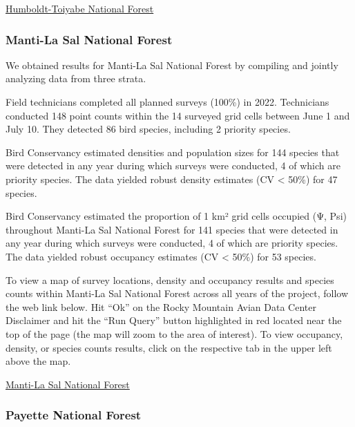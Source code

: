 \documentclass[
  letterpaper,
  DIV=11,
  numbers=noendperiod,
  oneside]{scrreprt}
\begin{document}
\href{http://www.rmbo.org/new_site/adc/QueryWindow.aspx\#N4IgzgrgDgpgTmALnAhoiBbEAuABCACUwCMB7AGwBNEBaAFVIEsBPFYmXAOTUdIDsU5XADFScGEhABfIA===}{Humboldt-Toiyabe
National Forest}

\hypertarget{manti-la-sal-national-forest}{%
\subsubsection{Manti-La Sal National
Forest}\label{manti-la-sal-national-forest}}

We obtained results for Manti-La Sal National Forest by compiling and
jointly analyzing data from three strata.

Field technicians completed all planned surveys (100\%) in 2022.
Technicians conducted 148 point counts within the 14 surveyed grid cells
between June 1 and July 10. They detected 86 bird species, including 2
priority species.

Bird Conservancy estimated densities and population sizes for 144
species that were detected in any year during which surveys were
conducted, 4 of which are priority species. The data yielded robust
density estimates (CV \textless{} 50\%) for 47 species.

Bird Conservancy estimated the proportion of 1 km² grid cells occupied
(Ψ, Psi) throughout Manti-La Sal National Forest for 141 species that
were detected in any year during which surveys were conducted, 4 of
which are priority species. The data yielded robust occupancy estimates
(CV \textless{} 50\%) for 53 species.

To view a map of survey locations, density and occupancy results and
species counts within Manti-La Sal National Forest across all years of
the project, follow the web link below. Hit ``Ok'' on the Rocky Mountain
Avian Data Center Disclaimer and hit the ``Run Query'' button
highlighted in red located near the top of the page (the map will zoom
to the area of interest). To view occupancy, density, or species counts
results, click on the respective tab in the upper left above the map.

\href{http://www.rmbo.org/new_site/adc/QueryWindow.aspx\#N4IgzgrgDgpgTmALnAhoiBbEAuABCAWRQDtEBLAWgBkVcBlFAG1wDk0yB7Yp3AMQ7gwkIAL5A===}{Manti-La
Sal National Forest}

\hypertarget{payette-national-forest}{%
\subsubsection{Payette National Forest}\label{payette-national-forest}}
\end{document}

